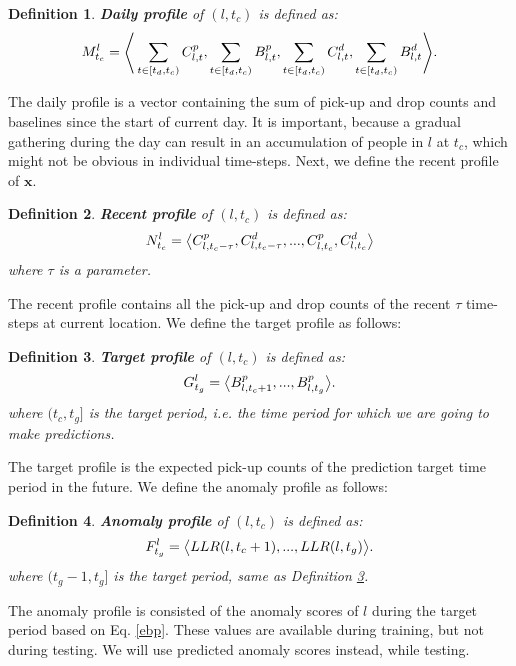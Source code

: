 \documentclass[letterpaper]{article} %
\newtheorem{definition}{Definition}
\begin{document}
\begin{definition}
	\textbf{Daily profile} of $(l,t_c)$ is defined as:
	\begin{equation}
	\small
	M^l_{t_c}=\Bigg\langle\sum_{t\in {[t_d,t_c)}}C^p_{l,t},\sum_{t\in {[t_d,t_c)}}B^p_{l,t},\sum_{t\in {[t_d,t_c)}}C^d_{l,t},\sum_{t\in {[t_d,t_c)}}B^d_{l,t}\Bigg\rangle.
	\end{equation}
\end{definition}
The daily profile is a vector containing the sum of pick-up and drop counts and baselines since the start of current day. It is important, because a gradual gathering during the day can result in an accumulation of people in $l$ at $t_c$, which might not be obvious in individual time-steps. Next, we define the recent profile of $\textbf{x}$.
\begin{definition}
	\textbf{Recent profile} of $(l,t_c)$ is defined as:
	\begin{equation}
	\small
	N^l_{t_c}=\big\langle C^p_{l,t_c-\tau},C^d_{l,t_c-\tau},..., C^p_{l,t_c},C^d_{l,t_c}\big\rangle
	\end{equation}
	where $\tau$ is a parameter.
\end{definition}
The recent profile contains all the pick-up and drop counts of the recent $\tau$ time-steps at current location.
We define the target profile as follows:
\begin{definition}
	\textbf{Target profile} of $(l,t_c)$ is defined as:
	\begin{equation}
	\small
	G^l_{t_g}=\big\langle B^p_{l,t_c+1},...,B^p_{l,t_g}\big\rangle.
	\end{equation}
	where ${(t_c,t_g]}$ is the target period, i.e. the time period for which we are going to make predictions.
	\label{target}
\end{definition}
The target profile is the expected pick-up counts of the prediction target time period in the future. We define the anomaly profile as follows:
\begin{definition}
	\textbf{Anomaly profile} of $(l,t_c)$ is defined as:
	\begin{equation}
	\small
	F^l_{t_g}=\big\langle LLR(l,t_c+1),...,LLR(l,t_g)\big\rangle.
	\end{equation}
	where ${(t_g-1,t_g]}$ is the target period, same as Definition \ref{target}.
\end{definition}
The anomaly profile is consisted of the anomaly scores of $l$ during the target period based on Eq. \ref{ebp}. These values are available during training, but not during testing. We will use predicted anomaly scores instead, while testing.
\end{document}
